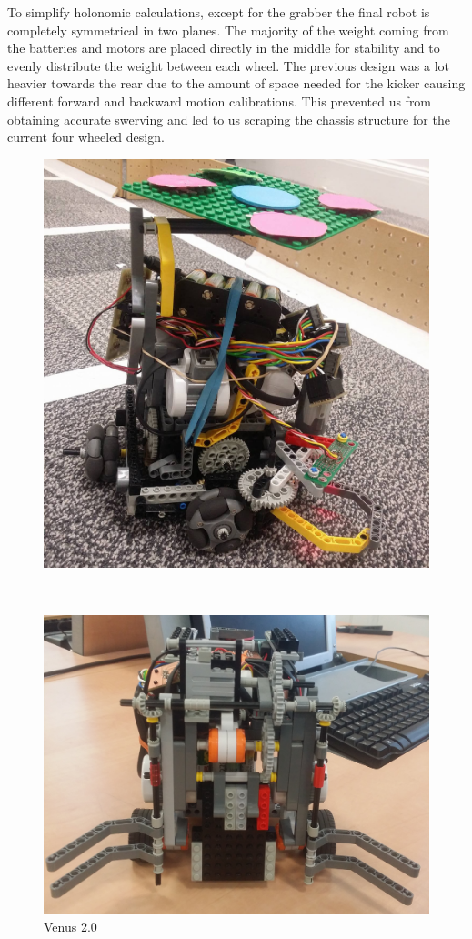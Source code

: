 \documentclass[a4paper,12pt]{article}
\begin{document}
To simplify holonomic calculations, except for the grabber the final robot is completely symmetrical in two planes. The majority of the weight coming from the batteries and motors are placed directly in the middle for stability and to evenly distribute the weight between each wheel. The previous design was a lot heavier towards the rear due to the amount of space needed for the kicker causing different forward and backward motion calibrations. This prevented us from obtaining accurate swerving and led to us scraping the chassis structure for the current four wheeled design.
\begin{figure}[ht]
	\begin{minipage}[b]{.405\textwidth}
        \centering
		\includegraphics[scale=0.1]{venus3.jpg}
		\caption{Venus 2.0}
		\label{fig:new}
	\end{minipage}
	~
	\begin{minipage}[b]{.59\textwidth}
        \centering
		\includegraphics[scale=0.065]{grab_open1.jpg}

\end{minipage}
\end{figure}
\end{document}
